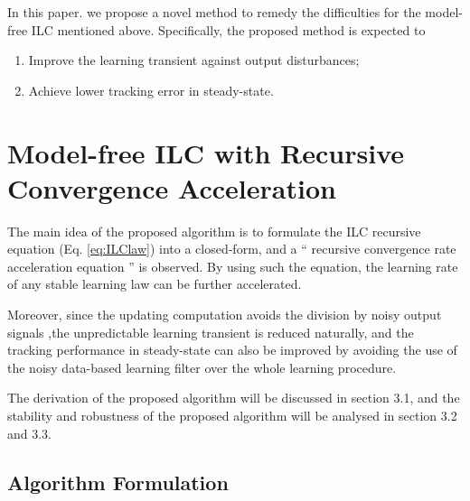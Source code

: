 \documentclass[a4paper, 12pt, twoside, openright]{mythesis}
\begin{document}
In this paper. we propose a novel method to remedy the difficulties for the model-free ILC mentioned above. Specifically, the proposed method is expected to
\begin{enumerate}
  \item Improve the learning transient against output disturbances;
  \item Achieve lower tracking error in steady-state.
\end{enumerate}






























\chapter{Model-free ILC with Recursive Convergence Acceleration}
\label{ch: Model-free ILC with Recursive Convergence Acceleration}

The main idea of the proposed algorithm is to formulate the ILC recursive equation (Eq. \ref{eq:ILClaw}) into a closed-form, and a “ recursive convergence rate acceleration equation ” is observed. By using such the equation, the learning rate of any stable learning law can be further accelerated. 

Moreover, since the updating computation avoids the division by noisy output signals ,the unpredictable learning transient is reduced naturally, and the tracking performance in steady-state can also be improved by avoiding the use of the noisy data-based learning filter over the whole learning procedure. 

The derivation of the proposed algorithm will be discussed in section 3.1, and the stability and robustness of the proposed algorithm will be analysed in section 3.2 and 3.3. 



\section{Algorithm Formulation}
\label{sec: Algorithm Formulation}
\end{document}
